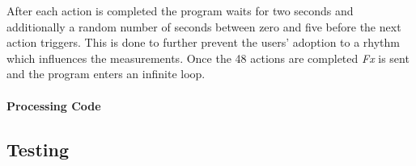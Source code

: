 After each action is completed the program waits for two seconds and additionally a random number of seconds between zero and five before the next action triggers.
This is done to further prevent the users' adoption to a rhythm which influences the measurements.
Once the 48 actions are completed \emph{Fx} is sent and the program enters an infinite loop.

\paragraph{Processing Code}


\subsection{Testing}

























